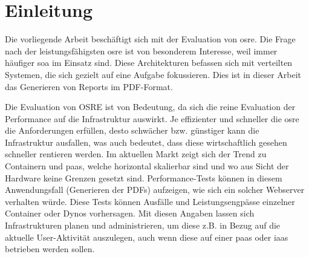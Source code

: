 \documentclass[main.tex]{subfiles}
\begin{document}


\chapter{Einleitung}





Die vorliegende Arbeit beschäftigt sich mit der Evaluation von \acrfull{osre}. Die Frage nach der leistungsfähigsten \acrshort{osre} ist von besonderem Interesse, weil immer häufiger \acrfull{soa} im Einsatz sind.  Diese Architekturen befassen sich mit verteilten Systemen, die sich gezielt auf eine Aufgabe fokussieren. Dies ist in dieser Arbeit das Generieren von Reports im PDF-Format.




Die Evaluation von OSRE ist von Bedeutung, da sich die reine Evaluation der Performance auf die Infrastruktur auswirkt. Je effizienter und schneller die \acrshort{osre} die Anforderungen erfüllen, desto schwächer bzw. günstiger kann die Infrastruktur ausfallen, was auch bedeutet, dass diese wirtschaftlich gesehen schneller rentieren werden. Im aktuellen Markt zeigt sich der Trend zu Containern und \acrfull{paas}, welche horizontal skalierbar sind und wo aus Sicht der Hardware keine Grenzen gesetzt sind.  Performance-Tests können in diesem Anwendungsfall (Generieren der PDFs) aufzeigen, wie sich ein solcher Webserver verhalten würde. Diese Tests können  Ausfälle und Leistungsengpässe einzelner Container oder Dynos vorhersagen. Mit diesen Angaben lassen sich Infrastrukturen planen und administrieren, um diese z.B. in Bezug auf die aktuelle User-Aktivität auszulegen, auch wenn diese auf einer \acrshort{paas} oder \acrfull{iaas} betrieben werden sollen. 
\end{document}
